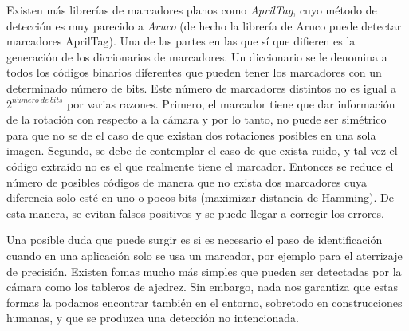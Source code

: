 Existen más librerías de marcadores planos como \textit{AprilTag}, cuyo método de detección es muy parecido a \textit{Aruco} (de hecho la librería de Aruco puede detectar marcadores AprilTag). Una de las partes en las que sí que difieren es la generación de los diccionarios de marcadores. Un diccionario se le denomina a todos los códigos binarios diferentes que pueden tener los marcadores con un determinado número de bits. Este número de marcadores distintos no es igual a $2^{n\acute{u}mero\ de\ bits}$ por varias razones. Primero, el marcador tiene que dar información de la rotación con respecto a la cámara y por lo tanto, no puede ser simétrico para que no se de el caso de que existan dos rotaciones posibles en una sola imagen. Segundo, se debe de contemplar el caso de que exista ruido, y tal vez el código extraído no es el que realmente tiene el marcador. Entonces se reduce el número de posibles códigos de manera que no exista dos marcadores cuya diferencia solo esté en uno o pocos bits (maximizar distancia de Hamming). De esta manera, se evitan falsos positivos y se puede llegar a corregir los errores. 

Una posible duda que puede surgir es si es necesario el paso de identificación cuando en una aplicación solo se usa un marcador, por ejemplo para el aterrizaje de precisión. Existen fomas mucho más simples que pueden ser detectadas por la cámara como los tableros de ajedrez. Sin embargo, nada nos garantiza que estas formas la podamos encontrar también en el entorno, sobretodo en construcciones humanas, y que se produzca una detección no intencionada.

